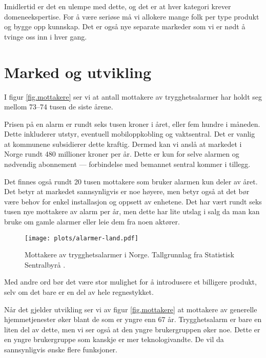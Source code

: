 Imidlertid er det en ulempe med dette, og det er at hver kategori krever
domeneekspertise. For å være seriøse må vi allokere mange folk per type produkt
og bygge opp kunnskap. Det er også nye separate markeder som vi er nødt å
tvinge oss inn i hver gang.


\section{Marked og utvikling}

I figur \vref{fig.mottakere} ser vi at antall mottakere av trygghetsalarmer har
holdt seg mellom 73--74 tusen de siste årene.  

Prisen på en alarm er rundt seks tusen kroner i året, eller fem hundre i
måneden. Dette inkluderer utstyr, eventuell mobiloppkobling og vaktsentral. Det
er vanlig at kommunene subsidierer dette kraftig. Dermed kan vi anslå at
markedet i Norge rundt 480 millioner kroner per år. Dette er kun for selve
alarmen og nødvendig abonnement --- forbindelse med bemannet sentral kommer i
tillegg.

Det finnes også rundt 20 tusen mottakere som bruker alarmen kun deler av året.
Det betyr at markedet sannsynligvis er noe høyere, men betyr også at det bør
være behov for enkel installasjon og oppsett av enhetene. Det har vært rundt
seks tusen nye mottakere av alarm per år, men dette har lite utslag i salg da
man kan bruke om gamle alarmer eller leie dem fra noen aktører.

\begin{figure}
  \texttt{[image: plots/alarmer-land.pdf]}
  \caption{Mottakere av trygghetsalarmer i Norge.
    Tallgrunnlag fra Statistisk Sentralbyrå \cite{iplos.2013}.}
  \label{fig.mottakere}
\end{figure}

Med andre ord bør det være stor mulighet for å introdusere et billigere
produkt, selv om det bare er en del av hele regnestykket.

Når det gjelder utvikling ser vi av figur \vref{fig.mottakere} at mottakere av
generelle hjemmetjenester øker blant de som er yngre enn 67 år. Trygghetsalarm
er bare en liten del av dette, men vi ser også at den yngre brukergruppen øker
noe. Dette er en yngre brukergruppe som kanskje er mer teknologivandte. De vil
da sannsynligvis ønske flere funksjoner.


